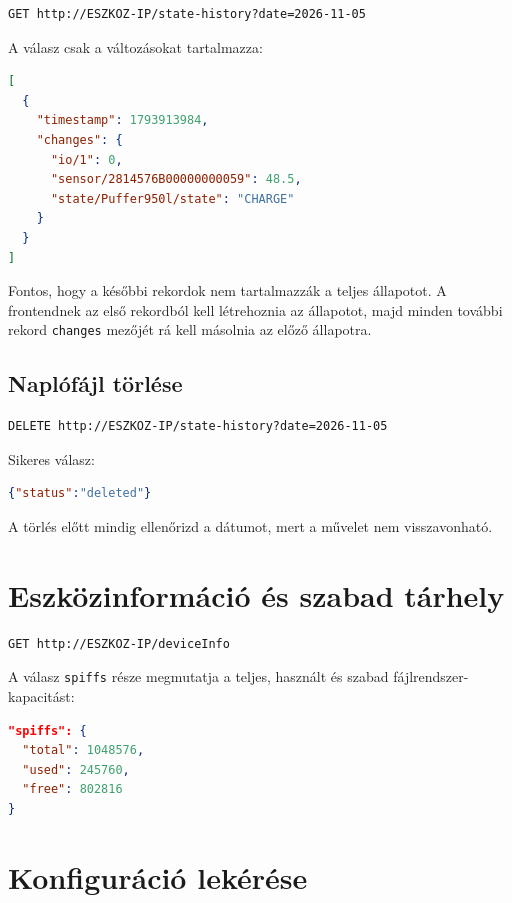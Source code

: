 \documentclass[11pt,a4paper]{article}
\begin{document}
\begin{lstlisting}
GET http://ESZKOZ-IP/state-history?date=2026-11-05
\end{lstlisting}

A válasz csak a változásokat tartalmazza:

\begin{lstlisting}[language=json]
[
  {
    "timestamp": 1793913984,
    "changes": {
      "io/1": 0,
      "sensor/2814576B00000000059": 48.5,
      "state/Puffer950l/state": "CHARGE"
    }
  }
]
\end{lstlisting}

Fontos, hogy a későbbi rekordok nem tartalmazzák a teljes állapotot. A frontendnek az első rekordból kell létrehoznia az állapotot, majd minden további rekord \texttt{changes} mezőjét rá kell másolnia az előző állapotra.

\subsection{Naplófájl törlése}

\begin{lstlisting}
DELETE http://ESZKOZ-IP/state-history?date=2026-11-05
\end{lstlisting}

Sikeres válasz:

\begin{lstlisting}[language=json]
{"status":"deleted"}
\end{lstlisting}

A törlés előtt mindig ellenőrizd a dátumot, mert a művelet nem visszavonható.

\section{Eszközinformáció és szabad tárhely}

\begin{lstlisting}
GET http://ESZKOZ-IP/deviceInfo
\end{lstlisting}

A válasz \texttt{spiffs} része megmutatja a teljes, használt és szabad fájlrendszer-kapacitást:

\begin{lstlisting}[language=json]
"spiffs": {
  "total": 1048576,
  "used": 245760,
  "free": 802816
}
\end{lstlisting}

\section{Konfiguráció lekérése}
\end{document}
